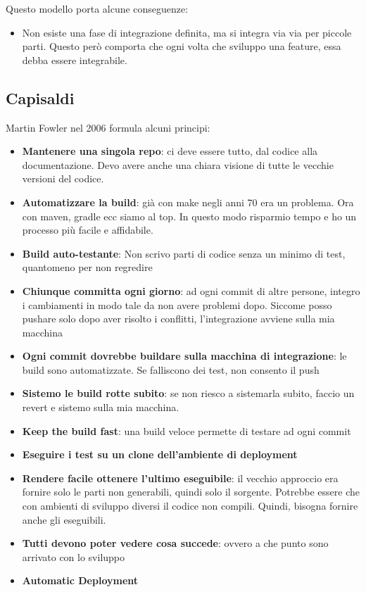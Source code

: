 \documentclass[a4paper,12pt]{article}
\begin{document}

Questo modello porta alcune conseguenze:
\begin{itemize}
\item Non esiste una fase di integrazione definita, ma si integra via via per piccole parti. Questo però comporta che ogni volta che sviluppo una feature, essa debba essere integrabile.
\end{itemize}

\subsection{Capisaldi}
Martin Fowler nel 2006 formula alcuni principi:
\begin{itemize}
\item \textbf{Mantenere una singola repo}: ci deve essere tutto, dal codice alla documentazione. Devo avere anche una chiara visione di tutte le vecchie versioni del codice.
\item \textbf{Automatizzare la build}: già con make negli anni 70 era un problema. Ora con maven, gradle ecc siamo al top. In questo modo risparmio tempo e ho un processo più facile e affidabile.
\item \textbf{Build auto-testante}: Non scrivo parti di codice senza un minimo di test, quantomeno per non regredire
\item \textbf{Chiunque committa ogni giorno}: ad ogni commit di altre persone, integro i cambiamenti in modo tale da non avere problemi dopo. Siccome posso pushare solo dopo aver risolto i conflitti, l'integrazione avviene sulla mia macchina
\item \textbf{Ogni commit dovrebbe buildare sulla macchina di integrazione}: le build sono automatizzate. Se falliscono dei test, non consento il push
\item \textbf{Sistemo le build rotte subito}: se non riesco a sistemarla subito, faccio un revert e sistemo sulla mia macchina.
\item \textbf{Keep the build fast}: una build veloce permette di testare ad ogni commit
\item \textbf{Eseguire i test su un clone dell'ambiente di deployment}
\item \textbf{Rendere facile ottenere l'ultimo eseguibile}: il vecchio approccio era fornire solo le parti non generabili, quindi solo il sorgente. Potrebbe essere che con ambienti di sviluppo diversi il codice non compili. Quindi, bisogna fornire anche gli eseguibili.
\item \textbf{Tutti devono poter vedere cosa succede}: ovvero a che punto sono arrivato con lo sviluppo
\item \textbf{Automatic Deployment}
\end{itemize}
\end{document}

